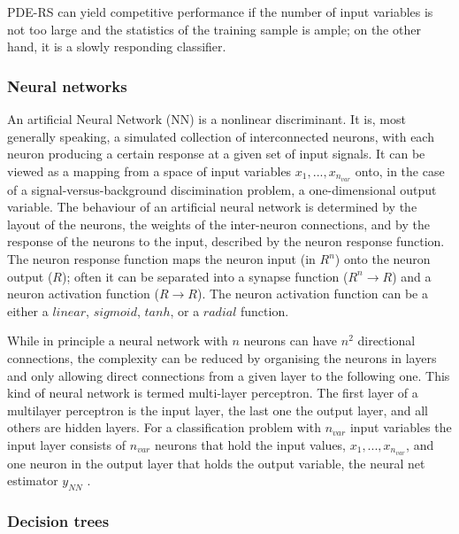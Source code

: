 PDE-RS can yield competitive performance if the number of input variables is
not too large and the statistics of the training sample is ample; on the other hand, it is a slowly responding classifier.


\subsubsection{Neural networks}

An artificial Neural Network (NN) is a nonlinear discriminant. It is, most generally speaking, a simulated collection of interconnected neurons, with each neuron producing a certain response at a given set of input signals. It can be viewed as a mapping from a space of input variables $x_1,...,x_{n_{var}}$ onto, in the case of a signal-versus-background discimination problem, a one-dimensional output variable. The behaviour of an artificial neural network is determined by the layout of the neurons, the weights of the inter-neuron connections, and by the response of the neurons to the input, described by the neuron response function.  %
The neuron response function maps the neuron input (in $R^n$) onto the neuron output ($R$); often it can be separated into a synapse function ($R^n \rightarrow R$) and a neuron activation function ($R \rightarrow R$). The neuron activation function can be a either a $linear$, $sigmoid$, $tanh$, or a $radial$ function.

While in principle a neural network with $n$ neurons can have $n^2$ directional connections, the complexity can be reduced by organising the neurons in layers and only allowing direct connections from a given layer to the following one. This kind of neural network is termed multi-layer perceptron. The first layer of a multilayer perceptron is the input layer, the last one the output layer, and all others are hidden layers. For a classification problem with $n_{var}$ input variables the input layer consists of $n_{var}$ neurons that hold the input values, $x_1,...,x_{n_{var}}$, and one neuron in the output layer that holds the output variable, the neural net estimator $y_{NN}$ .




\subsubsection{Decision trees}

